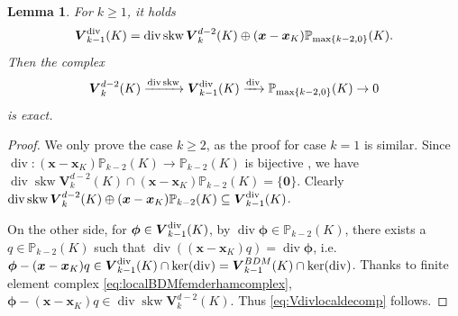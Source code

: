 \documentclass[10pt]{amsart}
\newtheorem{lemma}[theorem]{Lemma}
\renewcommand{\div}{\operatorname{div}}
\newcommand{\skw}{\operatorname{skw}}
\numberwithin{equation}{section}
\begin{document}
\begin{lemma}
For $k\geq1$,
it holds
\begin{equation}\label{eq:Vdivlocaldecomp}
\boldsymbol{V}_{k-1}^{\rm div}(K)=\div\skw \boldsymbol{V}_{k}^{d-2}(K) \oplus (\boldsymbol{x}-\boldsymbol{x}_K)\mathbb P_{\max\{k-2,0\}}(K).
\end{equation}
Then the complex
\begin{equation*}
\boldsymbol{V}_{k}^{d-2}(K)\xrightarrow{\div\skw}\boldsymbol{V}_{k-1}^{\rm div}(K)\xrightarrow{\div} \mathbb P_{\max\{k-2,0\}}(K)\to0    
\end{equation*}
is exact.
\end{lemma}
\begin{proof}
We only prove the case $k\geq2$, as the proof for case $k=1$ is similar.
Since $\div:(\boldsymbol{x}-\boldsymbol{x}_K)\mathbb P_{k-2}(K)\to\mathbb P_{k-2}(K)$ is bijective \cite[Lemma 3.1]{ChenHuang2021divdiv}, we have $\div\skw \boldsymbol{V}_{k}^{d-2}(K)\cap(\boldsymbol{x}-\boldsymbol{x}_K)\mathbb P_{k-2}(K)=\{\boldsymbol{0}\}$. Clearly $\div\skw \boldsymbol{V}_{k}^{d-2}(K) \oplus(\boldsymbol{x}-\boldsymbol{x}_K)\mathbb P_{k-2}(K)\subseteq \boldsymbol{V}_{k-1}^{\rm div}(K)$.

On the other side, for $\boldsymbol{\phi}\in \boldsymbol{V}_{k-1}^{\rm div}(K)$, by $\div\boldsymbol{\phi}\in \mathbb P_{k-2}(K)$, there exists a $q\in\mathbb P_{k-2}(K)$ such that $\div((\boldsymbol{x}-\boldsymbol{x}_K)q)=\div\boldsymbol{\phi}$, i.e. $\boldsymbol{\phi}-(\boldsymbol{x}-\boldsymbol{x}_K)q\in\boldsymbol{V}_{k-1}^{\rm div}(K)\cap\ker(\div)=\boldsymbol{V}_{k-1}^{BDM}(K)\cap\ker(\div)$. Thanks to finite element complex \eqref{eq:localBDMfemderhamcomplex}, $\boldsymbol{\phi}-(\boldsymbol{x}-\boldsymbol{x}_K)q\in\div\skw \boldsymbol{V}_{k}^{d-2}(K)$. Thus \eqref{eq:Vdivlocaldecomp} follows.
\end{proof}
\end{document}
